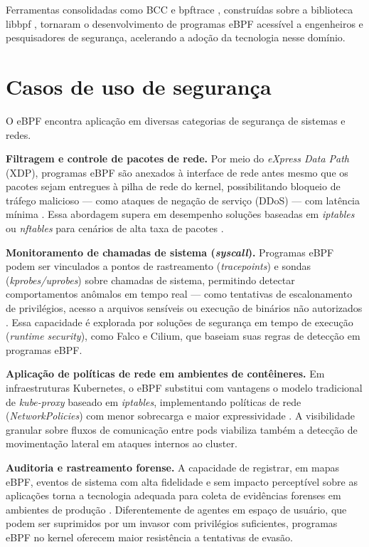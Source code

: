Ferramentas consolidadas como BCC \cite{bcc} e bpftrace \cite{bpftrace}, construídas
sobre a biblioteca libbpf \cite{libbpf}, tornaram o desenvolvimento de programas
eBPF acessível a engenheiros e pesquisadores de segurança, acelerando a adoção da
tecnologia nesse domínio.

\section{Casos de uso de segurança}

O eBPF encontra aplicação em diversas categorias de segurança de sistemas e redes.

\textbf{Filtragem e controle de pacotes de rede.}
Por meio do \textit{eXpress Data Path} (XDP), programas eBPF são anexados à interface
de rede antes mesmo que os pacotes sejam entregues à pilha de rede do kernel,
possibilitando bloqueio de tráfego malicioso — como ataques de negação de serviço
(DDoS) — com latência mínima \cite{linuxkernel2024}.
Essa abordagem supera em desempenho soluções baseadas em \textit{iptables} ou
\textit{nftables} para cenários de alta taxa de pacotes \cite{gregg2020}.

\textbf{Monitoramento de chamadas de sistema (\textit{syscall}).}
Programas eBPF podem ser vinculados a pontos de rastreamento (\textit{tracepoints})
e sondas (\textit{kprobes/uprobes}) sobre chamadas de sistema, permitindo detectar
comportamentos anômalos em tempo real — como tentativas de escalonamento de
privilégios, acesso a arquivos sensíveis ou execução de binários não autorizados
\cite{gregg2019}.
Essa capacidade é explorada por soluções de segurança em tempo de execução
(\textit{runtime security}), como Falco e Cilium, que baseiam suas regras de
detecção em programas eBPF.

\textbf{Aplicação de políticas de rede em ambientes de contêineres.}
Em infraestruturas Kubernetes, o eBPF substitui com vantagens o modelo tradicional
de \textit{kube-proxy} baseado em \textit{iptables}, implementando políticas de
rede (\textit{NetworkPolicies}) com menor sobrecarga e maior expressividade
\cite{cassagnes2020}.
A visibilidade granular sobre fluxos de comunicação entre pods viabiliza também
a detecção de movimentação lateral em ataques internos ao cluster.

\textbf{Auditoria e rastreamento forense.}
A capacidade de registrar, em mapas eBPF, eventos de sistema com alta fidelidade e
sem impacto perceptível sobre as aplicações torna a tecnologia adequada para coleta
de evidências forenses em ambientes de produção \cite{majors2022}.
Diferentemente de agentes em espaço de usuário, que podem ser suprimidos por um
invasor com privilégios suficientes, programas eBPF no kernel oferecem maior
resistência a tentativas de evasão.

